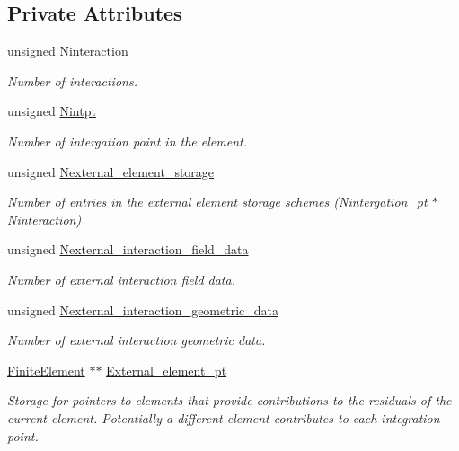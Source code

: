 \subsection*{Private Attributes}
\begin{DoxyCompactItemize}
\item 
unsigned \hyperlink{classoomph_1_1ElementWithExternalElement_ae0507a6c0f498237fa1e8fb75425374e}{Ninteraction}
\begin{DoxyCompactList}\small\item\em Number of interactions. \end{DoxyCompactList}\item 
unsigned \hyperlink{classoomph_1_1ElementWithExternalElement_adf2db2b2968b867ff989b31eda9cc245}{Nintpt}
\begin{DoxyCompactList}\small\item\em Number of intergation point in the element. \end{DoxyCompactList}\item 
unsigned \hyperlink{classoomph_1_1ElementWithExternalElement_a206553e5b109dd57b8b8fae4214d7a80}{Nexternal\+\_\+element\+\_\+storage}
\begin{DoxyCompactList}\small\item\em Number of entries in the external element storage schemes (Nintergation\+\_\+pt $\ast$ Ninteraction) \end{DoxyCompactList}\item 
unsigned \hyperlink{classoomph_1_1ElementWithExternalElement_a0efc97c132438693e09a50224cb82a24}{Nexternal\+\_\+interaction\+\_\+field\+\_\+data}
\begin{DoxyCompactList}\small\item\em Number of external interaction field data. \end{DoxyCompactList}\item 
unsigned \hyperlink{classoomph_1_1ElementWithExternalElement_a36b114ef8617af637cf3726308cb4304}{Nexternal\+\_\+interaction\+\_\+geometric\+\_\+data}
\begin{DoxyCompactList}\small\item\em Number of external interaction geometric data. \end{DoxyCompactList}\item 
\hyperlink{classoomph_1_1FiniteElement}{Finite\+Element} $\ast$$\ast$ \hyperlink{classoomph_1_1ElementWithExternalElement_a716c9187aad0ca94fc39391fed292f96}{External\+\_\+element\+\_\+pt}
\begin{DoxyCompactList}\small\item\em Storage for pointers to elements that provide contributions to the residuals of the current element. Potentially a different element contributes to each integration point. \end{DoxyCompactList}\item 
$$
\end{DoxyCompactItemize}
